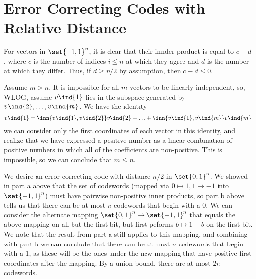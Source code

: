 \documentclass{article}
\begin{document}
\section{Error Correcting Codes with Relative Distance}
\begin{alphalist}
\item For vectors in $\set{-1, 1}^n$, it is clear that their innder product is equal to $c - d$, where $c$ is the number of indices $i \le n$ at which they agree and $d$ is the number at which they differ. Thus, if $d \ge n/2$ by assumption, then $c - d \le 0$.
\item Assume $m > n$. It is impossible for all $m$ vectors to be linearly independent, so, WLOG, assume $v\ind{1}$ lies in the subspace generated by $v\ind{2}, \ldots, v\ind{m}$. We have the identity $$v\ind{1} = \inn{v\ind{1}, v\ind{2}}v\ind{2} + \ldots + \inn{v\ind{1}, v\ind{m}}v\ind{m}$$ we can consider only the first coordinates of each vector in this identity, and realize that we have expressed a positive number as a linear combination of positive numbers in which all of the coefficients are non-positive. This is impossible, so we can conclude that $m \le n$.
\item We desire an error correcting code with distance $n/2$ in $\set{0, 1}^n$. We showed in part a above that the set of codewords (mapped via $0 \mapsto 1, 1 \mapsto -1$ into $\set{-1, 1}^n$) must have pairwise non-positive inner products, so part b above tells us that there can be at most $n$ codewords that begin with a 0. We can consider the alternate mapping $\set{0, 1}^n \to \set{-1, 1}^n$ that equals the above mapping on all but the first bit, but first peforms $b \mapsto 1-b$ on the first bit. We note that the result from part a still applies to this mapping, and combining with part b we can conclude that there can be at most $n$ codewords that begin with a 1, as these will be the ones under the new mapping that have positive first coordinates after the mapping. By a union bound, there are at most $2n$ codewords.
\end{alphalist}
\end{document}
